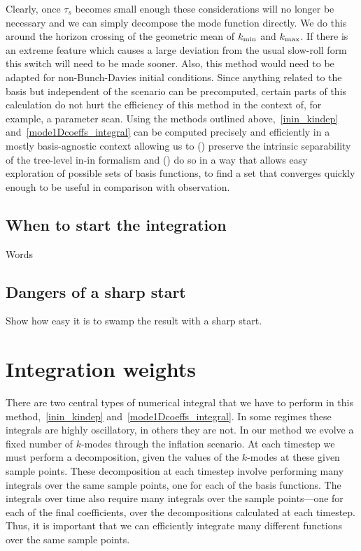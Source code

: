Clearly, once $\tau_s$ becomes small enough these considerations will no longer be necessary
and we can simply decompose the mode function directly.
We do this around the horizon crossing of the geometric mean of ${k_\text{min}}$ and ${k_\text{max}}$.
If there is an extreme feature which causes a large deviation from the usual slow-roll form
this switch will need to be made sooner. 
Also, this method would need to be adapted for non-Bunch-Davies initial conditions.
Since anything related to the basis but independent of the scenario can be
precomputed, certain parts of this calculation do not hurt the efficiency of this
method in the context of, for example, a parameter scan.
Using the methods outlined above,~\eqref{inin_kindep} and~\eqref{mode1Dcoeffs_integral}
can be computed precisely and efficiently in a mostly basis-agnostic context
allowing us to ({}) preserve the intrinsic separability of the tree-level
in-in formalism and ({}) do so in a way that allows easy exploration of possible
sets of basis functions, to find a set that converges quickly enough to
be useful in comparison with observation.
    \subsection{When to start the integration}
    Words
    \subsection{Dangers of a sharp start}
    Show how easy it is to swamp the result with a sharp start.
\section{Integration weights}
    There are two central types of numerical integral that we have to perform
    in this method,~\eqref{inin_kindep} and~\eqref{mode1Dcoeffs_integral}.
    In some regimes these integrals are highly oscillatory, in others they are not.
    In our method we evolve a fixed number of $k$-modes through the inflation scenario.
    At each timestep we must perform a decomposition, given the values of the $k$-modes
    at these given sample points.
    These decomposition at each timestep involve performing many integrals over the same
    sample points, one for each of the basis functions.
    The integrals over time also require many integrals over the sample points---one
    for each of the final coefficients, over the decompositions calculated at each timestep.
    Thus, it is important that we can efficiently integrate many different functions
    over the same sample points.


